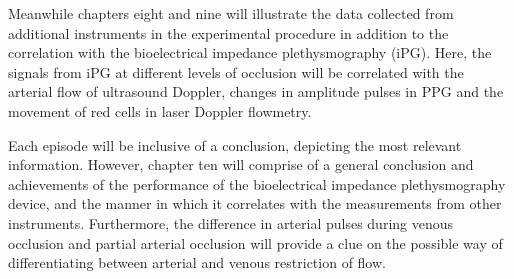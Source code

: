 Meanwhile chapters eight and nine will illustrate the data collected from additional instruments in the experimental procedure in addition to the correlation with the bioelectrical impedance plethysmography (iPG). Here, the signals from iPG at different levels of occlusion will be correlated with the arterial flow of ultrasound Doppler, changes in amplitude pulses in PPG and the movement of red cells in laser Doppler flowmetry. 

Each episode will be inclusive of a conclusion, depicting the most relevant information. However, chapter ten will comprise of a general conclusion and achievements of the performance of the bioelectrical impedance plethysmography device, and the manner in which it correlates with the measurements from other instruments. Furthermore, the difference in arterial pulses during venous occlusion and partial arterial occlusion will provide a clue on  the possible way of differentiating between arterial and venous restriction of flow.



 

